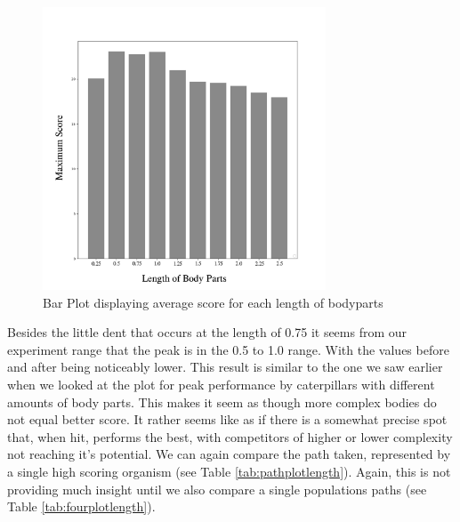 \documentclass[12pt,oneside,listof=totoc,paper=a4,headings=small]{scrbook}
\begin{document}
\begin{figure}[h!]
\centering
\includegraphics[width=0.75\textwidth,height=0.75\textheight,keepaspectratio]{images/length-bars.png}
\caption{Bar Plot displaying average score for each length of bodyparts}
\label{fig:length_bars}
\end{figure}

Besides the little dent that occurs at the length of 0.75 it seems from our experiment range that the peak is in the 0.5 to 1.0 range. With the values before and after being noticeably lower. This result is similar to the one we saw earlier when we looked at the plot for peak performance by caterpillars with different amounts of body parts. This makes it seem as though more complex bodies do not equal better score. It rather seems like as if there is a somewhat precise spot that, when hit, performs the best, with competitors of higher or lower complexity not reaching it's potential.  
We can again compare the path taken, represented by a single high scoring organism (see Table \ref{tab:pathplotlength}). Again, this is not providing much insight until we also compare a single populations paths (see Table \ref{tab:fourplotlength}).

\newpage
\end{document}
